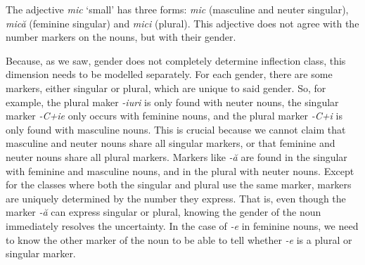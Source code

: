 The adjective \textit{mic} `small' has three forms: \textit{mic} (masculine and neuter singular), \textit{mică} (feminine singular) and \textit{mici} (plural). This adjective does not agree with the number markers on the nouns, but with their gender.

Because, as we saw, gender does not completely determine inflection class, this dimension needs to be modelled separately. For each gender, there are some markers, either singular or plural, which are unique to said gender. So, for example, the plural maker \textit{-iuri} is only found with neuter nouns, the singular marker \textit{-C+ie} only occurs with feminine nouns, and the plural marker \textit{-C+i} is only found with masculine nouns. This is crucial because we cannot claim that masculine and neuter nouns share all singular markers, or that feminine and neuter nouns share all plural markers. Markers like \textit{-ă} are found in the singular with feminine and masculine nouns, and in the plural with neuter nouns. Except for the classes where both the singular and plural use the same marker, markers are uniquely determined by the number they express. That is, even though the marker \textit{-ă} can express singular or plural, knowing the gender of the noun immediately resolves the uncertainty. In the case of \textit{-e} in feminine nouns, we need to know the other marker of the noun to be able to tell whether \textit{-e} is a plural or singular marker.


